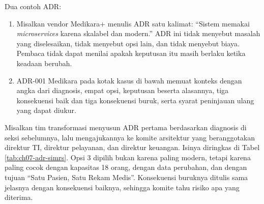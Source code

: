 Dua contoh ADR:
\begin{enumerate}
  \item Misalkan vendor Medikara+ menulis ADR satu kalimat: ``Sistem memakai
        \textit{microservices} karena skalabel dan modern.'' ADR ini tidak menyebut masalah yang
        diselesaikan, tidak menyebut opsi lain, dan tidak menyebut biaya. Pembaca tidak dapat
        menilai apakah keputusan itu masih berlaku ketika keadaan berubah.
  \item ADR-001 Medikara pada kotak kasus di bawah memuat konteks dengan angka dari diagnosis,
        empat opsi, keputusan beserta alasannya, tiga konsekuensi baik dan tiga konsekuensi buruk,
        serta syarat peninjauan ulang yang dapat diukur.
\end{enumerate}

\begin{kasus}[title={Kasus Medikara Health: ADR-001 Gaya Arsitektur SIMRS Terpadu}]
  Misalkan tim transformasi menyusun ADR pertama berdasarkan diagnosis di seksi sebelumnya, lalu
  mengajukannya ke komite arsitektur yang beranggotakan direktur TI, direktur pelayanan, dan direktur
  keuangan. Isinya diringkas di Tabel \ref{tab:ch07-adr-simrs}. Opsi 3 dipilih bukan karena paling
  modern, tetapi karena paling cocok dengan kapasitas 18 orang, dengan data perubahan, dan dengan
  tujuan ``Satu Pasien, Satu Rekam Medis''. Konsekuensi buruknya ditulis sama jelasnya dengan
  konsekuensi baiknya, sehingga komite tahu risiko apa yang diterima.
\end{kasus}

